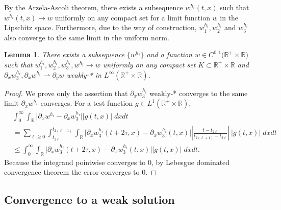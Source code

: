\documentclass[a4paper,11pt]{article}
\def\R{\mathbb{R}}
\newtheorem{lemma}{Lemma}[section]
\theoremstyle{remark}
\begin{document}
By the Arzela-Ascoli theorem, there exists a subsequence $w^{h_i}(t,x)$ such that $w^{h_i}(t,x)\to w$ uniformly on any compact set for a limit function $w$ in the Lipschitz space. Furthermore, due to the way of construction, $w_1^{h_i},w_2^{h_i}$ and $w_3^{h_i}$ also converge to the same limit in the uniform norm.

\begin{lemma}\label{compactness} There exists a subsequence $\{w^{h_i}\}$ and a function $w\in C^{0,1}\big(\R^+\times \R\big)$ such that $w_1^{h_i},w_2^{h_i},w_3^{h_i},w^{h_i}\rightarrow w$ uniformly on any compact set $K \subset \R^+\times \R$ and $\partial_x w_3^{h_i}, \partial_x w^{h_i} \rightharpoonup \partial_y w$ weakly-* in $L^\infty(\R^+\times \mathbb{R})$.
\end{lemma}
\begin{proof}
 We prove only the assertion that $\partial_x w_3^{h_i}$ weakly-* converges to the same limit $\partial_x w^{h_i}$ converges.  %
 For a test function $g\in L^1(\R^+\times \mathbb{R})$,
 \begin{align*}
  &\int_0^\infty\int_\mathbb{R} \Big|\partial_x {w}^{h_i} - \partial_x w_3^{h_i}\Big| \Big|g(t,x)\Big| \; dxdt  \\%
  &= \sum_{\ell\ge0}\int_{t_{2\ell}}^{t_{2(\ell+1)}}\int_\mathbb{R} \Big|\partial_x w_3^{h_i}(t+2\tau,x)-\partial_x w_3^{h_i}(t,x) \Big| \left|\frac{t-t_{2\ell}}{t_{2(\ell+1)}-t_{2\ell}}\right|~\Big|g(t,x)\Big| \;dxdt\\
  &\le \int_0^\infty \int_\mathbb{R} \Big|\partial_x w_3^{h_i}(t+2\tau,x)-\partial_x w_3^{h_i}(t,x) \Big| \Big|g(t,x)\Big| \; dxdt.
 \end{align*}
 Because the integrand pointwise converges to $0$, by Lebesgue dominated convergence theorem the error converges to $0$.
\end{proof}

\subsection{Convergence to a weak solution}
\end{document}
